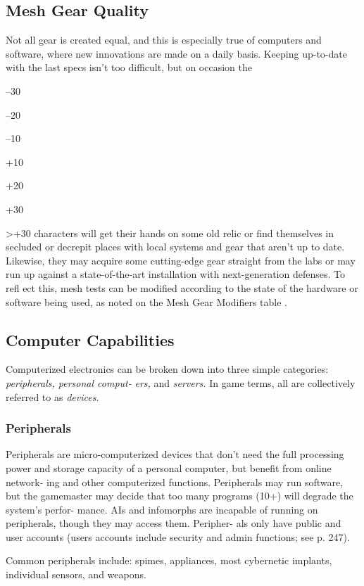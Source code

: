 \subsection{Mesh Gear Quality}

Not all gear is created equal, and this is especially true 
of computers and software, where new innovations 
are made on a daily basis. Keeping up-to-date with 
the last specs isn't too difficult, but on occasion the 

–30

–20

–10

+10

+20

+30

>+30
characters will get their hands on some old relic or 
find themselves in secluded or decrepit places with 
local systems and gear that aren't up to date. Likewise, 
they may acquire some cutting-edge gear straight 
from the labs or may run up against a state-of-the-art 
installation with next-generation defenses. To refl ect 
this, mesh tests can be modified according to the state 
of the hardware or software being used, as noted on 
the Mesh Gear Modifiers table
.

\subsection{Computer Capabilities}

Computerized electronics can be broken down into 
three simple categories: \textit{peripherals, personal comput-}
\textit{ers,  }and  \textit{servers.} In game terms, all are collectively 
referred to as \textit{devices.}

\subsubsection{Peripherals}

Peripherals are micro-computerized devices that don't 
need the full processing power and storage capacity of 
a personal computer, but benefit from online network-
ing and other computerized functions. Peripherals may 
run software, but the gamemaster may decide that too 
many programs (10+) will degrade the system's perfor-
mance. AIs and infomorphs are incapable of running 
on peripherals, though they may access them. Peripher-
als only have public and user accounts (users accounts 
include security and admin functions; see p. 247).

Common peripherals include: spimes, appliances, most 
cybernetic implants, individual sensors, and weapons.

